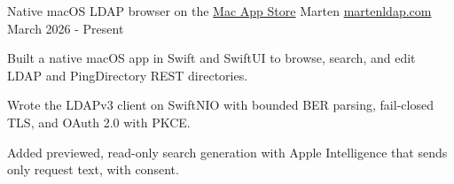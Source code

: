 \begin{cventries}
  \cventry
    {Native macOS LDAP browser on the \href{https://apps.apple.com/us/app/marten-ldap/id6790461411}{Mac App Store}}
    {Marten}
    {\href{https://martenldap.com}{martenldap.com}}
    {March 2026 - Present}
    {
      \begin{cvitems}
        \item {Built a native macOS app in Swift and SwiftUI to browse, search, and edit LDAP and PingDirectory REST directories.}
        \item {Wrote the LDAPv3 client on SwiftNIO with bounded BER parsing, fail-closed TLS, and OAuth 2.0 with PKCE.}
        \item {Added previewed, read-only search generation with Apple Intelligence that sends only request text, with consent.}
      \end{cvitems}
    }
\end{cventries}
